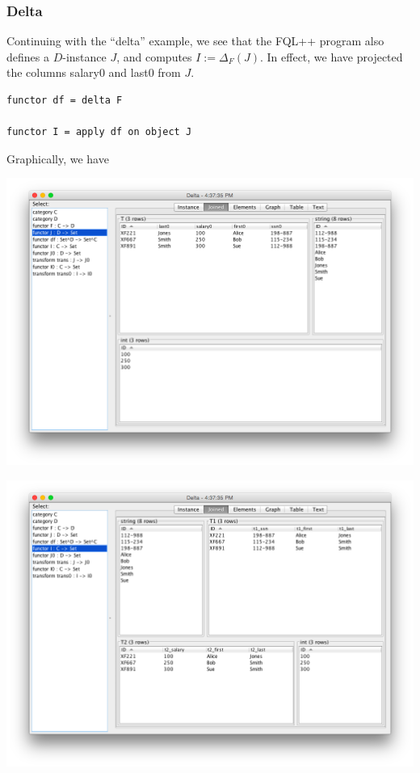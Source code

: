 \documentclass[12pt]{article}
\begin{document}
\subsubsection{Delta}

Continuing with the ``delta'' example, we see that the FQL++ program also defines a $D$-instance $J$, and computes $I := \Delta_F(J)$.  In effect, we have projected the columns salary0 and last0 from $J$.  

\begin{verbatim}
functor df = delta F

functor I = apply df on object J
\end{verbatim}

Graphically, we have

\begin{center}
\includegraphics[width=6in]{deltaJ}

\includegraphics[width=6in]{deltaI}
\end{center}
\end{document}

